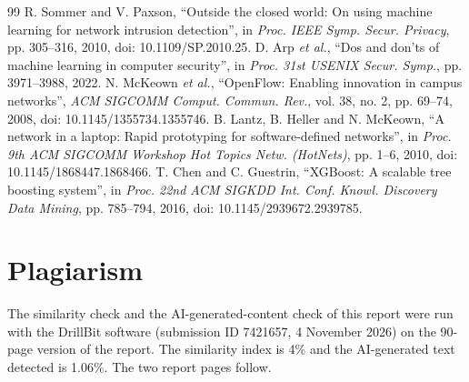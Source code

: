 \documentclass[12pt,a4paper]{report}
\begin{document}
\begin{thebibliography}{99}
 R. Sommer and V. Paxson, ``Outside the closed world: On using machine learning for network intrusion detection'', in \textit{Proc. IEEE Symp. Secur. Privacy}, pp. 305--316, 2010, doi: 10.1109/SP.2010.25.
 D. Arp \textit{et al.}, ``Dos and don'ts of machine learning in computer security'', in \textit{Proc. 31st USENIX Secur. Symp.}, pp. 3971--3988, 2022.
 N. McKeown \textit{et al.}, ``OpenFlow: Enabling innovation in campus networks'', \textit{ACM SIGCOMM Comput. Commun. Rev.}, vol. 38, no. 2, pp. 69--74, 2008, doi: 10.1145/1355734.1355746.
 B. Lantz, B. Heller and N. McKeown, ``A network in a laptop: Rapid prototyping for software-defined networks'', in \textit{Proc. 9th ACM SIGCOMM Workshop Hot Topics Netw. (HotNets)}, pp. 1--6, 2010, doi: 10.1145/1868447.1868466.
 T. Chen and C. Guestrin, ``XGBoost: A scalable tree boosting system'', in \textit{Proc. 22nd ACM SIGKDD Int. Conf. Knowl. Discovery Data Mining}, pp. 785--794, 2016, doi: 10.1145/2939672.2939785.
\end{thebibliography}
\clearpage
\chapter*{Plagiarism}
The similarity check and the AI-generated-content check of this report were run with the DrillBit software (submission ID 7421657, 4 November 2026) on the 90-page version of the report. The similarity index is 4\% and the AI-generated text detected is 1.06\%. The two report pages follow.
\clearpage



\appendix
\renewcommand{\thechapter}{\Alph{chapter}}
\renewcommand{\thesection}{\Roman{section}}
\end{document}
